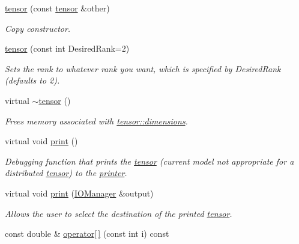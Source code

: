 \begin{DoxyCompactItemize}
\hyperlink{classJKBuilder_1_1tensor_a35bcdda56953bef8e76bfed569bbf54c}{tensor} (const \hyperlink{classJKBuilder_1_1tensor}{tensor} \&other)
\begin{DoxyCompactList}\small\item\em Copy constructor. \item\end{DoxyCompactList}\item 
\hyperlink{classJKBuilder_1_1tensor_aceb793f098521f84a758cc6f5ff8a997}{tensor} (const int DesiredRank=2)
\begin{DoxyCompactList}\small\item\em Sets the rank to whatever rank you want, which is specified by DesiredRank (defaults to 2). \item\end{DoxyCompactList}\item 
virtual \hyperlink{classJKBuilder_1_1tensor_ac8c25ac32c0d7ab75d3764e014b05997}{$\sim$tensor} ()
\begin{DoxyCompactList}\small\item\em Frees memory associated with \hyperlink{classJKBuilder_1_1tensor_a2ce1e6e0782ddee097f2c4aa2663d3e9}{tensor::dimensions}. \item\end{DoxyCompactList}\item 
virtual void \hyperlink{classJKBuilder_1_1tensor_a388f572c62279f839ee138a9afbdeeb5}{print} ()
\begin{DoxyCompactList}\small\item\em Debugging function that prints the \hyperlink{classJKBuilder_1_1tensor}{tensor} (current model not appropriate for a distributed \hyperlink{classJKBuilder_1_1tensor}{tensor}) to the \hyperlink{classJKBuilder_1_1printer}{printer}. \item\end{DoxyCompactList}\item 
virtual void \hyperlink{classJKBuilder_1_1tensor_a74b2fe351a5444c1325870dc6162f451}{print} (\hyperlink{classJKBuilder_1_1IOManager}{IOManager} \&output)
\begin{DoxyCompactList}\small\item\em Allows the user to select the destination of the printed \hyperlink{classJKBuilder_1_1tensor}{tensor}. \item\end{DoxyCompactList}\item 
const double \& \hyperlink{classJKBuilder_1_1tensor_a4f0dc1b84b580cec49500c70f87e084a}{operator\mbox{[}$\,$\mbox{]}} (const int i) const 

\end{DoxyCompactItemize}
